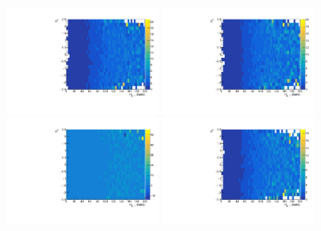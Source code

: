 \begin{figure}[htbp]
  \begin{center}
		\includegraphics[width=0.4\textwidth]{Thesis (Version 2246)/figures/chapter04/vbfgghSFs_20160.pdf}
  \includegraphics[width=0.4\textwidth]{Thesis (Version 2246)/figures/chapter04/vbfgghSFs_20165.pdf}\\
  \includegraphics[width=0.4\textwidth]{Thesis (Version 2246)/figures/chapter04/vbfgghSFs_2017.pdf}
  \includegraphics[width=0.4\textwidth]{Thesis (Version 2246)/figures/chapter04/vbfgghSFs_2018.pdf}
    \label{fig:ggHweight}
\end{center}
\end{figure}


